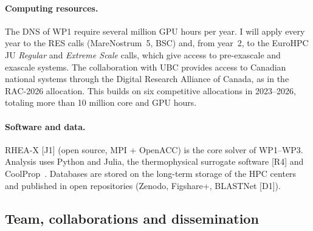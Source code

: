 \documentclass[11pt]{article}
\begin{document}
\paragraph{Computing resources.} The DNS of WP1 require several million GPU hours per year. I will apply every year to the RES calls (MareNostrum~5, BSC) and, from year~2, to
the EuroHPC JU \emph{Regular} and \emph{Extreme Scale} calls, which give access to
pre-exascale and exascale systems. The collaboration with UBC provides access to Canadian
national systems through the Digital Research Alliance of Canada, as in the RAC-2026
allocation. This builds on six competitive allocations in 2023--2026, totaling more than 10
million core and GPU hours.

\paragraph{Software and data.} RHEA-X [J1] (open source, MPI + OpenACC) is the core solver of
WP1--WP3. Analysis uses Python and Julia, the thermophysical surrogate software [R4] and
CoolProp~\cite{CoolProp2014}. Databases are stored on the long-term storage of the HPC centers
and published in open repositories (Zenodo, Figshare+, BLASTNet [D1]).


\subsection{Team, collaborations and dissemination}\label{sec:mobility}\label{sec:dissemination}
\end{document}
